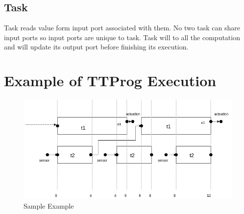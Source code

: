 \documentclass[16pt]{report}
\begin{document}
\subsection{Task}
Task reads value form input port associated with them. No two task can share input ports so input ports are unique to task. Task will to all the computation and will update its output port before finishing its execution.



\section{Example of TTProg Execution}
\begin{figure}[H]
\centering
\includegraphics[width=0.9\linewidth]{2Example.png}
\caption{Sample Example}
\end{figure}
\end{document}
